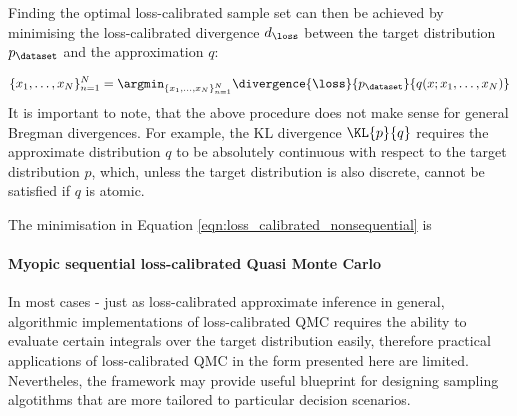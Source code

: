 Finding the optimal loss-calibrated sample set can then be achieved by minimising the loss-calibrated divergence $d_\loss$ between the target distribution $p_\dataset$ and the approximation $q$:

\begin{equation}
	\{x_1,\ldots,x_N\}_{n=1}^{N} = \argmin_{\{x_1,\ldots,x_N\}_{n=1}^{N}} \divergence{\loss}{p_\dataset}{q(x ; x_1,\ldots,x_N)} \label{eqn:loss_calibrated_nonsequential}
\end{equation}
It is important to note, that the above procedure does not make sense for general Bregman divergences. For example, the KL divergence $\KL{p}{q}$ requires the approximate distribution $q$ to be absolutely continuous with respect to the target distribution $p$, which, unless the target distribution is also discrete, cannot be satisfied if $q$ is atomic.

The minimisation in Equation \eqref{eqn:loss_calibrated_nonsequential} is 
\paragraph{Myopic sequential loss-calibrated Quasi Monte Carlo}


In most cases - just as loss-calibrated approximate inference in general, algorithmic implementations of loss-calibrated QMC requires the ability to evaluate certain integrals over the target distribution easily, therefore practical applications of loss-calibrated QMC in the form presented here are limited. Nevertheles, the framework may provide useful blueprint for designing sampling algotithms that are more tailored to particular decision scenarios.

